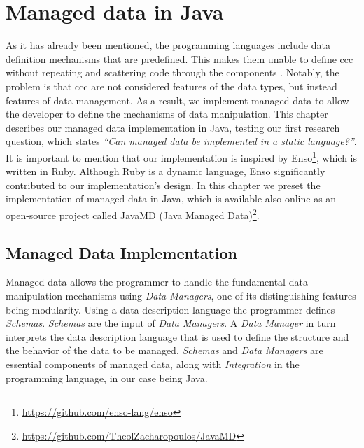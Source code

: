 
\chapter{Managed data in Java}\label{Implementation}

As it has already been mentioned, the programming languages include data definition mechanisms that are predefined. 
This makes them unable to define \ac{ccc} without repeating and scattering code through the components \cite{loh2012managed}.
Notably, the problem is that \ac{ccc} are not considered features of the data types, but instead features of data management.
As a result, we implement managed data to allow the developer to define the mechanisms of data manipulation.
This chapter describes our managed data implementation in Java, testing our first research question, which states \textit{``Can managed data be implemented in a static language?''}.
It is important to mention that our implementation is inspired by Enso\footnote{\url{https://github.com/enso-lang/enso}}, which is written in Ruby. 
Although Ruby is a dynamic language, Enso significantly contributed to our implementation's design.
In this chapter we preset the implementation of managed data in Java, which is available also online as an open-source project called JavaMD (Java Managed Data)\footnote{\url{https://github.com/TheolZacharopoulos/JavaMD}}.

\section{Managed Data Implementation}\label{sec:Managed Data Implementation}
Managed data allows the programmer to handle the fundamental data manipulation mechanisms using \textit{Data Managers}, one of its distinguishing features being modularity.
Using a data description language the programmer defines \textit{Schemas}. 
\textit{Schemas} are the input of \textit{Data Managers}. 
A \textit{Data Manager} in turn interprets the data description language that is used to define the structure and the behavior of the data to be managed.
\textit{Schemas} and \textit{Data Managers} are essential components of managed data, along with \textit{Integration} in the programming language, in our case being Java.


